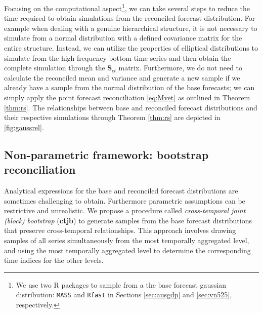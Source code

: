 \documentclass[12pt]{article}
\newcommand{\Svet}{\bm{S}}
\theoremstyle{definition}
\begin{document}
Focusing on the computational aspect\footnote{We use two R packages to sample from a the base forecast gaussian distribution: \texttt{MASS} \citep{mass2002} and \texttt{Rfast} \citep{rfast2022} in Sections \ref{sec:ausgdp} and \ref{sec:vn525}, respectively.}, we can take several steps to reduce the time required to obtain simulations from the reconciled forecast distribution. For example when dealing with a genuine hierarchical structure, it is not necessary to simulate from a normal distribution with a defined covariance matrix for the entire structure. Instead, we can utilize the properties of elliptical distributions to simulate from the high frequency bottom time series and then obtain the complete simulation through the $\Svet_{ct}$ matrix. Furthermore, we do not need to calculate the reconciled mean and variance and generate a new sample if we already have a sample from the normal distribution of the base forecasts; we can simply apply the point forecast reconciliation \eqref{eq:Mvet} as outlined in Theorem \ref{thm:rs}. The relationships between base and reconciled forecast distributions and their respective simulations through Theorem \ref{thm:rs} are depicted in \autoref{fig:gaussrel}.

\subsection{Non-parametric framework: bootstrap reconciliation}\label{ssec:boot}

Analytical expressions for the base and reconciled forecast distributions are sometimes challenging to obtain. Furthermore parametric assumptions can be restrictive and unrealistic. We propose a procedure called \textit{cross-temporal joint (block) bootstrap} (\textbf{ctjb}) to generate samples from the base forecast distributions that preserve cross-temporal relationships. This approach involves drawing samples of all series simultaneously from the most temporally aggregated level, and using the most temporally aggregated level to determine the corresponding time indices for the other levels.
\end{document}
